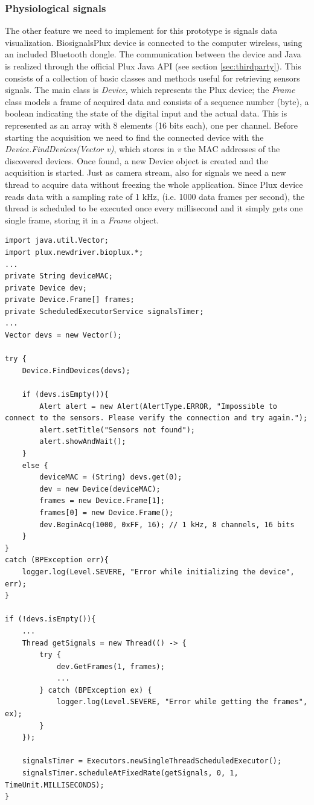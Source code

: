 \documentclass[binding=0.6cm,LaM]{sapthesis}
\begin{document}
\subsubsection{Physiological signals}
The other feature we need to implement for this prototype is signals data visualization. BiosignalsPlux device is connected to the computer wireless, using an included Bluetooth dongle.
The communication between the device and Java is realized through the official Plux Java API (see section \ref{sec:thirdparty}). This consists of a collection of basic classes and methods useful for retrieving sensors signals. The main class is \textit{Device}, which represents the Plux device; the \textit{Frame} class models a frame of acquired data and consists of a sequence number (byte), a boolean indicating the state of the digital input and the actual data. This is represented as an array with 8 elements (16 bits each), one per channel. Before starting the acquisition we need to find the connected device with the \textit{Device.FindDevices(Vector v)}, which stores in \textit{v} the MAC addresses of the discovered devices. Once found, a new Device object is created and the acquisition is started. Just as camera stream, also for signals we need a new thread to acquire data without freezing the whole application. Since Plux device reads data with a sampling rate of 1 kHz, (i.e. 1000 data frames per second), the thread is scheduled to be executed once every millisecond and it simply gets one single frame, storing it in a \textit{Frame} object.
\\
\begin{lstlisting}[caption={Sensors data acquisition}, captionpos=b]
import java.util.Vector;
import plux.newdriver.bioplux.*;
...
private String deviceMAC;
private Device dev;
private Device.Frame[] frames;
private ScheduledExecutorService signalsTimer;
...
Vector devs = new Vector();
        
try {
	Device.FindDevices(devs);          
            
	if (devs.isEmpty()){
		Alert alert = new Alert(AlertType.ERROR, "Impossible to connect to the sensors. Please verify the connection and try again.");
		alert.setTitle("Sensors not found");
		alert.showAndWait();
    }
    else {
    	deviceMAC = (String) devs.get(0);
		dev = new Device(deviceMAC);
		frames = new Device.Frame[1];
		frames[0] = new Device.Frame();
		dev.BeginAcq(1000, 0xFF, 16); // 1 kHz, 8 channels, 16 bits
    }
}
catch (BPException err){
	logger.log(Level.SEVERE, "Error while initializing the device", err); 
}   

if (!devs.isEmpty()){
	...
	Thread getSignals = new Thread(() -> {
		try {
    		dev.GetFrames(1, frames);
    		...
    	} catch (BPException ex) {
    		logger.log(Level.SEVERE, "Error while getting the frames", ex);
    	}
	});

	signalsTimer = Executors.newSingleThreadScheduledExecutor();
	signalsTimer.scheduleAtFixedRate(getSignals, 0, 1, TimeUnit.MILLISECONDS);
}
        
\end{lstlisting}
\end{document}
